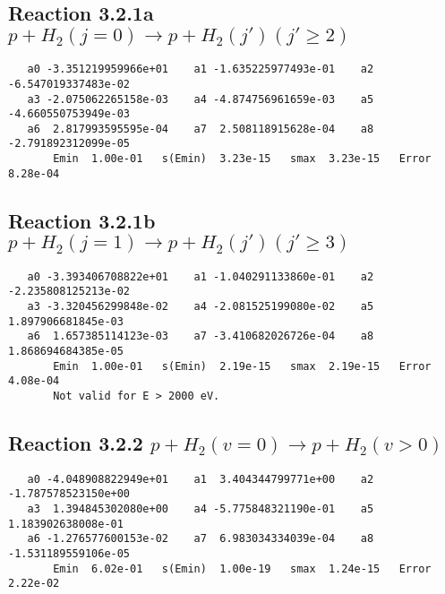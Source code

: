 \documentclass[12pt]{article}
\begin{document}
\newpage
\subsection{Reaction 3.2.1a $   p + H_2(j=0) \rightarrow p + H_2(j')   (j' \geq 2)$}


\begin{small}\begin{verbatim}
   a0 -3.351219959966e+01    a1 -1.635225977493e-01    a2 -6.547019337483e-02
   a3 -2.075062265158e-03    a4 -4.874756961659e-03    a5 -4.660550753949e-03
   a6  2.817993595595e-04    a7  2.508118915628e-04    a8 -2.791892312099e-05
       Emin  1.00e-01   s(Emin)  3.23e-15   smax  3.23e-15   Error  8.28e-04
\end{verbatim}\end{small}




                               


\newpage
\subsection{
Reaction 3.2.1b $   p + H_2(j=1) \rightarrow p + H_2(j')   (j' \geq 3)$}


\begin{small}\begin{verbatim}
   a0 -3.393406708822e+01    a1 -1.040291133860e-01    a2 -2.235808125213e-02
   a3 -3.320456299848e-02    a4 -2.081525199080e-02    a5  1.897906681845e-03
   a6  1.657385114123e-03    a7 -3.410682026726e-04    a8  1.868694684385e-05
       Emin  1.00e-01   s(Emin)  2.19e-15   smax  2.19e-15   Error  4.08e-04
       Not valid for E > 2000 eV.
\end{verbatim}\end{small}


\newpage
\subsection{Reaction 3.2.2 $   p + H_2(v=0) \rightarrow p + H_2(v > 0)$}


\begin{small}\begin{verbatim}
   a0 -4.048908822949e+01    a1  3.404344799771e+00    a2 -1.787578523150e+00
   a3  1.394845302080e+00    a4 -5.775848321190e-01    a5  1.183902638008e-01
   a6 -1.276577600153e-02    a7  6.983034334039e-04    a8 -1.531189559106e-05
       Emin  6.02e-01   s(Emin)  1.00e-19   smax  1.24e-15   Error  2.22e-02
\end{verbatim}\end{small}
\end{document}
